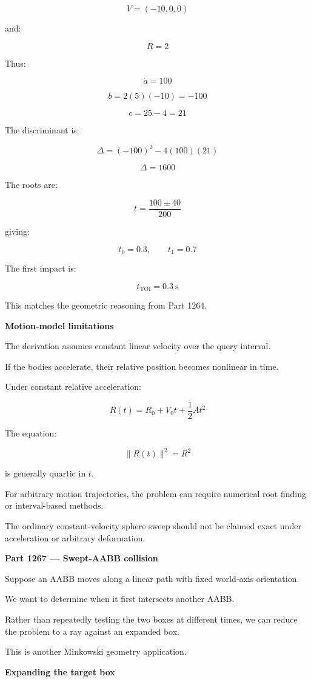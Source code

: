 \[
V=(-10,0,0)
\]

and:

\[
R=2
\]

Thus:

\[
a=100
\]

\[
b=2(5)(-10)=-100
\]

\[
c=25-4=21
\]

The discriminant is:

\[
\Delta=(-100)^2-4(100)(21)
\]

\[
\Delta=1600
\]

The roots are:

\[
t=\frac{100\pm40}{200}
\]

giving:

\[
t_0=0.3,\qquad t_1=0.7
\]

The first impact is:

\[
\boxed{t_{\mathrm{TOI}}=0.3\ \mathrm{s}}
\]

This matches the geometric reasoning from Part 1264.

\textbf{Motion-model limitations}

The derivation assumes constant linear velocity over the query interval.

If the bodies accelerate, their relative position becomes nonlinear in time.

Under constant relative acceleration:

\[
R(t)=R_0+V_0t+\frac12At^2
\]

The equation:

\[
\|R(t)\|^2=R^2
\]

is generally quartic in \(t\).

For arbitrary motion trajectories, the problem can require numerical root finding or interval-based methods.

The ordinary constant-velocity sphere sweep should not be claimed exact under acceleration or arbitrary deformation.

\textbf{Part 1267 --- Swept-AABB collision}

Suppose an AABB moves along a linear path with fixed world-axis orientation.

We want to determine when it first intersects another AABB.

Rather than repeatedly testing the two boxes at different times, we can reduce the problem to a ray against an expanded box.

This is another Minkowski geometry application.

\textbf{Expanding the target box}

